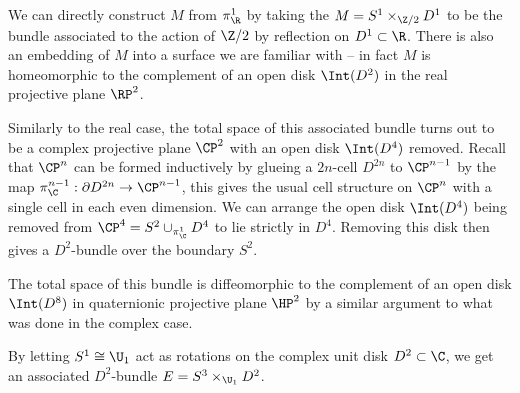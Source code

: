 We can directly construct $M$ from $\pi_\R^1$ by taking the $M = S^1\times_{\Z/2} D^1$ to be the bundle associated to the action of $\Z/2$ by reflection on $D^1\subset \R$. There is also an embedding of $M$ into a surface we are familiar with -- in fact $M$ is homeomorphic to the complement of an open disk $\Int(D^2)$ in the real projective plane $\RP^2$.

Similarly to the real case, the total space of this associated bundle turns out to be a complex projective plane $\CP^2$ with an open disk $\Int(D^4)$ removed. Recall that $\CP^n$ can be formed inductively by glueing a $2n$-cell $D^{2n}$ to $\CP^{n-1}$ by the map $\pi_\C^{n-1} : \partial D^{2n} \to \CP^{n-1}$, this gives the usual cell structure on $\CP^n$ with a single cell in each even dimension.
We can arrange the open disk $\Int(D^4)$ being removed from $\CP^4 = S^2\cup_{\pi_\C^1} D^4$ to lie strictly in $D^4$. Removing this disk then gives a $D^2$-bundle over the boundary $S^2$.


The total space of this bundle is diffeomorphic to the complement of an open disk $\Int(D^8)$ in quaternionic projective plane $\HP^2$ by a similar argument to what was done in the complex case.

By letting $S^1\cong \U_1$ act as rotations on the complex unit disk $D^2\subset \C$, we get an associated $D^2$-bundle $E = S^3\times_{\U_1} D^2$.





